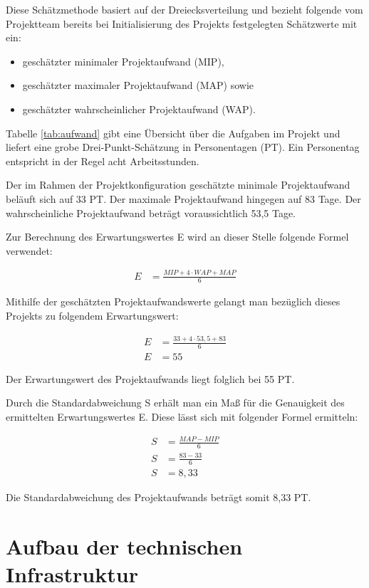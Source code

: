 \documentclass[a4paper,11pt,listof=numbered,glossary=totoc,parskip=half,toc=bib]{scrreprt}
\begin{document}
Diese Schätzmethode basiert auf der Dreiecksverteilung und bezieht folgende vom Projektteam bereits bei Initialisierung des Projekts festgelegten Schätzwerte mit ein:

\begin{itemize}
	\item geschätzter minimaler Projektaufwand (MIP),
	\item geschätzter maximaler Projektaufwand (MAP) sowie
	\item geschätzter wahrscheinlicher Projektaufwand (WAP).
\end{itemize}

Tabelle \ref{tab:aufwand} gibt eine Übersicht über die Aufgaben im Projekt und liefert eine grobe Drei-Punkt-Schätzung in Personentagen (PT). Ein Personentag entspricht in der Regel acht Arbeitsstunden.

Der im Rahmen der Projektkonfiguration geschätzte minimale Projektaufwand beläuft sich auf 33 PT. Der maximale Projektaufwand hingegen
auf 83 Tage. Der wahrscheinliche Projektaufwand beträgt voraussichtlich 53,5 Tage. 

Zur Berechnung des Erwartungswertes E wird an dieser Stelle folgende Formel verwendet:

\begin{align}
E &= \frac{MIP + 4 \cdot WAP + MAP}{6}
\end{align}

Mithilfe der geschätzten Projektaufwandswerte gelangt man bezüglich dieses Projekts zu folgendem Erwartungswert:

\begin{align}
E &= \frac{33 + 4 \cdot 53,5 + 83}{6}\\
E &= 55
\end{align}

Der Erwartungswert des Projektaufwands liegt folglich bei 55 PT.

Durch die Standardabweichung S erhält man ein Maß für die Genauigkeit des ermittelten Erwartungswertes E. Diese lässt sich mit folgender Formel ermitteln:

\begin{align}
S &= \frac{MAP - MIP}{6} \\
S &= \frac{83 - 33}{6} \\
S &= 8,33
\end{align}

Die Standardabweichung des Projektaufwands beträgt somit 8,33 PT.
	
	\newpage
	\section{Aufbau der technischen Infrastruktur}
\end{document}
